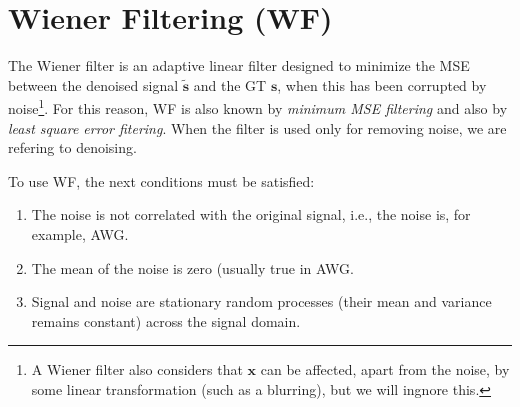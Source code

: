 \chapter{Wiener Filtering (WF)}

The Wiener filter \cite{wiener1942extrapolation} is an adaptive linear
filter designed to minimize the MSE between the denoised signal
$\tilde{\mathbf{s}}$ and the \gls{GT} $\mathbf{s}$, when this has been
corrupted by noise\footnote{A Wiener filter also considers that
  $\mathbf{x}$ can be affected, apart from the noise, by some linear
  transformation (such as a blurring), but we will ingnore this.}. For
this reason, \gls{WF} is also known by \emph{minimum \gls{MSE} filtering} and also
by \emph{least square error fitering}. When the filter is used only
for removing noise, we are refering to denoising.

To use \gls{WF}, the next conditions must be satisfied:
\begin{enumerate}
\item The noise is not correlated with the original signal, i.e., the
  noise is, for example, \gls{AWG}.
\item The mean of the noise is zero (usually true in \gls{AWG}.
\item Signal and noise are stationary random processes (their mean and
  variance remains constant) across the signal domain.
\end{enumerate}

